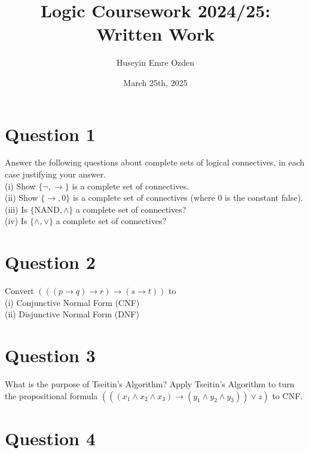 \documentclass[12pt]{fphw}
\title{Logic Coursework 2024/25: Written Work}
\author{Huseyin Emre Ozden}
\date{March 25th, 2025}
\institute{Durham University}
\begin{document}
\maketitle

\section*{Question 1}

\begin{problem}
  Answer the following questions about complete sets of logical connectives, in each case justifying your answer. \\
  (i) Show $\{\neg, \to \}$ is a complete set of connectives. \\
  (ii) Show $\{\to, 0\}$ is a complete set of connectives (where $0$ is the constant false). \\
  (iii) Is $\{ \text{NAND}, \wedge\}$ a complete set of connectives? \\
  (iv) Is $\{\wedge, \vee\}$ a complete set of connectives?
\end{problem}

\section*{Question 2}

\begin{problem}
  Convert $(((p \to q) \to r) \to (s \to t))$ to \\
  (i) Conjunctive Normal Form (CNF) \\
  (ii) Disjunctive Normal Form (DNF)
\end{problem}

\section*{Question 3}

\begin{problem}
  What is the purpose of Tseitin's Algorithm? Apply Tseitin's Algorithm to turn the propositional formula $(((x_1 \wedge x_2 \wedge x_3) \to (y_1 \wedge y_2 \wedge y_3)) \vee z)$ to CNF.
\end{problem}

\section*{Question 4}
\end{document}
